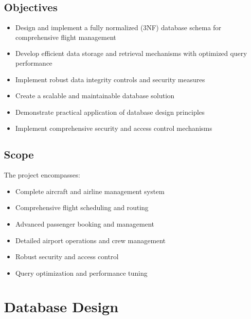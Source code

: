 \documentclass[a4paper,12pt]{article}
\begin{document}
\subsection{Objectives}
\begin{itemize}
    \item Design and implement a fully normalized (3NF) database schema for comprehensive flight management
    \item Develop efficient data storage and retrieval mechanisms with optimized query performance
    \item Implement robust data integrity controls and security measures
    \item Create a scalable and maintainable database solution
    \item Demonstrate practical application of database design principles
    \item Implement comprehensive security and access control mechanisms
\end{itemize}

\subsection{Scope}
The project encompasses:
\begin{itemize}
    \item Complete aircraft and airline management system
    \item Comprehensive flight scheduling and routing
    \item Advanced passenger booking and management
    \item Detailed airport operations and crew management
    \item Robust security and access control
    \item Query optimization and performance tuning
\end{itemize}

\section{Database Design}
\end{document}
